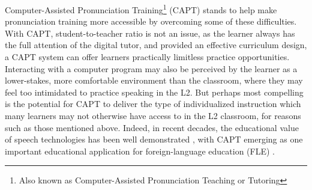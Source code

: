 Computer-Assisted Pronunciation Training\footnote{Also known as Computer-Assisted Pronunciation Teaching or Tutoring} (CAPT) stands to help make pronunciation training more accessible by overcoming some of these difficulties. 
With CAPT, student-to-teacher ratio is not an issue, as the learner always has the full attention of the digital tutor, and provided an effective curriculum design, a CAPT system can offer learners practically limitless practice opportunities. Interacting with a computer program may also be perceived by the learner as a lower-stakes, more comfortable environment than the classroom, where they may feel too intimidated to practice speaking in the L2. But perhaps most compelling is the potential for CAPT 
to deliver the type of individualized instruction
which many learners may not otherwise have access to in the L2 classroom, for reasons such as those mentioned above.
%
Indeed, in recent decades, the educational value of speech technologies has been well demonstrated \citep{Eskenazi2009}, with CAPT emerging as one important educational application for foreign-language education (FLE) \citep{Neri2002,Delmonte2011,Witt2012}. 
%
%	
%
%
%	
%	
